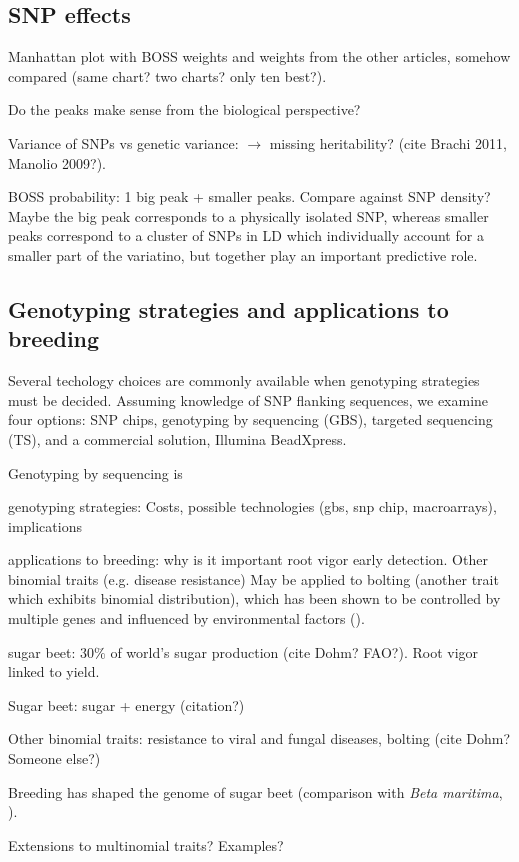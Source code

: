 \subsection{SNP effects}
Manhattan plot with BOSS weights and weights from the other articles,
somehow compared (same chart? two charts? only ten best?).

Do the peaks make sense from the biological perspective?

Variance of SNPs vs genetic variance: $\rightarrow$ missing
heritability? (cite Brachi 2011, Manolio 2009?).

BOSS probability: 1 big peak + smaller peaks. Compare against SNP
density? Maybe the big peak corresponds to a physically isolated SNP,
whereas smaller peaks correspond to a cluster of SNPs in LD which
individually account for a smaller part of the variatino, but together
play an important predictive role. 


\subsection{Genotyping strategies and applications to breeding}
Several techology choices are commonly available when genotyping strategies
must be decided. Assuming knowledge of SNP flanking sequences, we examine
four options: SNP chips, genotyping by sequencing (GBS), targeted sequencing (TS),
and a commercial solution, Illumina BeadXpress.


Genotyping by sequencing is 

genotyping strategies: 
Costs, possible technologies (gbs, snp chip, macroarrays), implications

applications to breeding:
why is it important root vigor early detection. Other binomial traits (e.g.
disease resistance) May be applied to bolting (another trait which
exhibits binomial distribution), which has been shown to be controlled
by multiple genes and influenced by environmental factors
(\cite{salah2012genetic}).

sugar beet: $30\%$ of world's sugar production (cite Dohm? FAO?). Root
vigor linked to yield.

Sugar beet: sugar + energy (citation?)

Other binomial traits: resistance to viral and fungal diseases, bolting
(cite Dohm? Someone else?)

Breeding has shaped the genome of sugar beet (comparison with \emph{Beta
  maritima}, \cite{dohm2013genome}).

Extensions to multinomial traits? Examples?

